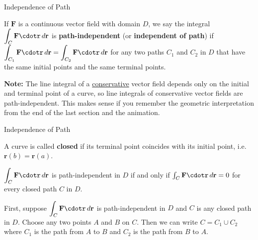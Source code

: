 \documentclass[11pt,english,
handout
]{beamer}
\begin{document}
\begin{frame}{Independence of Path}
\small
\begin{definition}
If $\mathbf{F}$ is a continuous vector field with domain $D$, we say the integral $\displaystyle \int_C\mathbf{F}\cdotr\,d\mathbf{r}$ is \textbf{path-independent} (or \textbf{independent of path}) if $\displaystyle \int_{C_1}\mathbf{F}\cdotr \,d\mathbf{r}=\int_{C_2}\mathbf{F}\cdotr\,d\mathbf{r}$ for any two paths $C_1$ and $C_2$ in $D$ that have the same initial points and the same terminal points.
\end{definition}\pause

\lspace
\textbf{Note:} The line integral of a \uline{conservative} vector field depends only on the initial and terminal point of a curve, so line integrals of conservative vector fields are path-independent. This makes sense if you remember the geometric interpretation from the end of the last section and the animation.
\end{frame}
 
 
 
 
 
 
 
 
 
 
 
 
 

 
\begin{frame}[t]{Independence of Path}
\small
 \begin{definition}
 A curve is called \textbf{closed} if its terminal point coincides with its initial point, i.e. $\mathbf{r}(b)=\mathbf{r}(a)$.
 \end{definition}\pause 
 
 \lspace
 \begin{theorem}
 $\displaystyle \int_C\mathbf{F}\cdotr\,d\mathbf{r}$ is path-independent in $D$ if and only if $\int_C\mathbf{F}\cdotr\,d\mathbf{r}=0$ for every closed path $C$ in $D$.
 \end{theorem}\pause
 \lspace
 
\begin{proofs}
First, suppose  $\displaystyle \int_C\mathbf{F}\cdotr\,d\mathbf{r}$ is path-independent in $D$ and $C$ is any closed path in $D$. \pause Choose any two points $A$ and $B$ on $C$. Then we can write $C=C_1\cup C_2$ where $C_1$ is the path from $A$ to $B$ and $C_2$ is the path from $B$ to $A$.
\end{proofs}
\end{frame}
\end{document}
